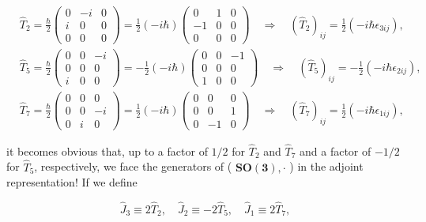 \documentclass[10pt, letterpaper]{article}
\begin{document}
$$
\begin{aligned}
& \hat{T}_{2}=\frac{\hbar}{2}\left(\begin{array}{ccc}
0 & -i & 0 \\
i & 0 & 0 \\
0 & 0 & 0
\end{array}\right)=\frac{1}{2}(-i \hbar)\left(\begin{array}{ccc}
0 & 1 & 0 \\
-1 & 0 & 0 \\
0 & 0 & 0
\end{array}\right) \quad \Longrightarrow \quad\left(\hat{T}_{2}\right)_{i j}=\frac{1}{2}\left(-i \hbar \epsilon_{3 i j}\right), \\
& \hat{T}_{5}=\frac{\hbar}{2}\left(\begin{array}{ccc}
0 & 0 & -i \\
0 & 0 & 0 \\
i & 0 & 0
\end{array}\right)=-\frac{1}{2}(-i \hbar)\left(\begin{array}{ccc}
0 & 0 & -1 \\
0 & 0 & 0 \\
1 & 0 & 0
\end{array}\right) \quad \Longrightarrow \quad\left(\hat{T}_{5}\right)_{i j}=-\frac{1}{2}\left(-i \hbar \epsilon_{2 i j}\right), \\
& \hat{T}_{7}=\frac{\hbar}{2}\left(\begin{array}{ccc}
0 & 0 & 0 \\
0 & 0 & -i \\
0 & i & 0
\end{array}\right)=\frac{1}{2}(-i \hbar)\left(\begin{array}{ccc}
0 & 0 & 0 \\
0 & 0 & 1 \\
0 & -1 & 0
\end{array}\right) \quad \Longrightarrow \quad\left(\hat{T}_{7}\right)_{i j}=\frac{1}{2}\left(-i \hbar \epsilon_{1 i j}\right),
\end{aligned}
$$

it becomes obvious that, up to a factor of $1 / 2$ for $\hat{T}_{2}$ and $\hat{T}_{7}$ and a factor of $-1 / 2$ for $\hat{T}_{5}$, respectively, we face the generators of ( $\boldsymbol{S O}(\mathbf{3}), \cdot$ ) in the adjoint representation! If we define

$$
\hat{J}_{3} \equiv 2 \hat{T}_{2}, \quad \hat{J}_{2} \equiv-2 \hat{T}_{5}, \quad \hat{J}_{1} \equiv 2 \hat{T}_{7},
$$
\end{document}

